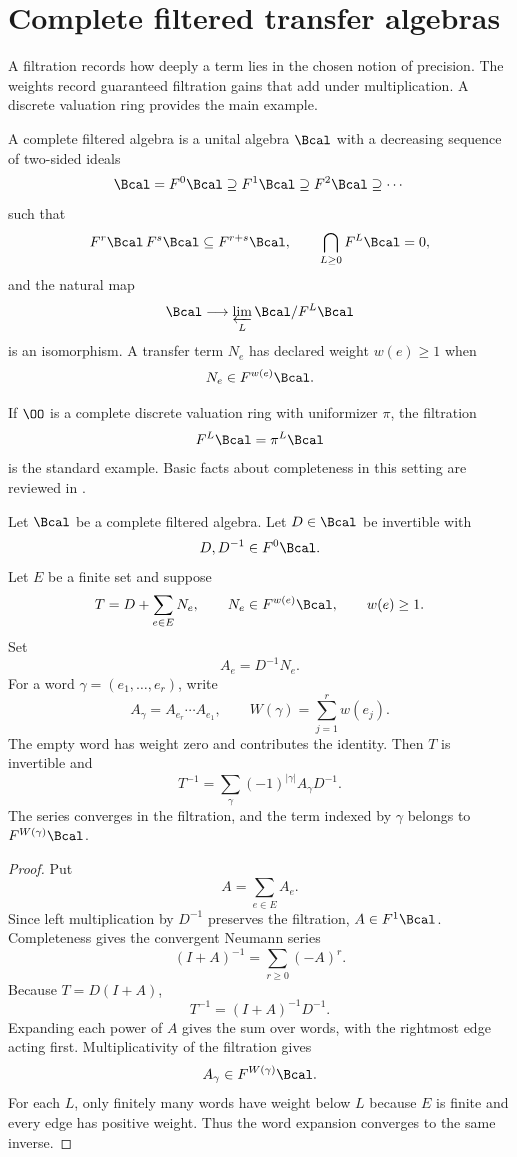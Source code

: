 \section{Complete filtered transfer algebras}\label{sec:filtered}

A filtration records how deeply a term lies in the chosen notion of precision. The weights record guaranteed filtration gains that add under multiplication. A discrete valuation ring provides the main example.

\begin{definition}\label{def:filtered_algebra}
A complete filtered algebra is a unital algebra $\Bcal$ with a decreasing sequence of two-sided ideals
\[
\Bcal=F^0\Bcal\supseteq F^1\Bcal\supseteq F^2\Bcal\supseteq\cdots
\]
such that
\[
F^r\Bcal\,F^s\Bcal\subseteq F^{r+s}\Bcal,
\qquad
\bigcap_{L\geq0}F^L\Bcal=0,
\]
and the natural map
\[
\Bcal\longrightarrow\varprojlim_L\Bcal/F^L\Bcal
\]
is an isomorphism.  A transfer term $N_e$ has declared weight $w(e)\geq1$ when
\[
N_e\in F^{w(e)}\Bcal.
\]
\end{definition}

If $\OO$ is a complete discrete valuation ring with uniformizer $\pi$, the filtration
\[
F^L\Bcal=\pi^L\Bcal
\]
is the standard example.  Basic facts about completeness in this setting are reviewed in \cite{Serre1979}.

\begin{theorem}\label{thm:weighted_inverse}
Let $\Bcal$ be a complete filtered algebra.  Let $D\in\Bcal$ be invertible with
\[
D,D^{-1}\in F^0\Bcal.
\]
Let $E$ be a finite set and suppose
\[
T=D+\sum_{e\in E}N_e,
\qquad
N_e\in F^{w(e)}\Bcal,
\qquad
w(e)\geq1.
\]
Set
\[
A_e=D^{-1}N_e.
\]
For a word $\gamma=(e_1,\ldots,e_r)$, write
\[
A_\gamma=A_{e_r}\cdots A_{e_1},
\qquad
W(\gamma)=\sum_{j=1}^rw(e_j).
\]
The empty word has weight zero and contributes the identity.  Then $T$ is invertible and
\[
T^{-1}
=
\sum_\gamma(-1)^{|\gamma|}A_\gamma D^{-1}.
\]
The series converges in the filtration, and the term indexed by $\gamma$ belongs to $F^{W(\gamma)}\Bcal$.
\end{theorem}

\begin{proof}
Put
\[
A=\sum_{e\in E}A_e.
\]
Since left multiplication by $D^{-1}$ preserves the filtration, $A\in F^1\Bcal$.  Completeness gives the convergent Neumann series
\[
(I+A)^{-1}=\sum_{r\geq0}(-A)^r.
\]
Because $T=D(I+A)$,
\[
T^{-1}=(I+A)^{-1}D^{-1}.
\]
Expanding each power of $A$ gives the sum over words, with the rightmost edge acting first.  Multiplicativity of the filtration gives
\[
A_\gamma\in F^{W(\gamma)}\Bcal.
\]
For each $L$, only finitely many words have weight below $L$ because $E$ is finite and every edge has positive weight.  Thus the word expansion converges to the same inverse.
\end{proof}

